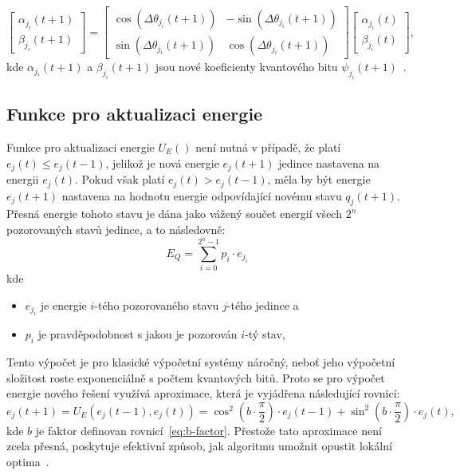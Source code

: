 \begin{equation*}
    \begin{bmatrix}
        \alpha_{j_i}\left(t+1\right) \\
        \beta_{j_i}\left(t+1\right)
    \end{bmatrix}
    =
    \begin{bmatrix}
        \cos{\left( \Delta\theta_{j_i}\left(t+1\right) \right)} & - \sin{\left( \Delta\theta_{j_i}\left(t+1\right) \right)} \\
        \sin{\left( \Delta\theta_{j_i}\left(t+1\right) \right)} &   \cos{\left( \Delta\theta_{j_i}\left(t+1\right) \right)}
    \end{bmatrix}
    \begin{bmatrix}
        \alpha_{j_i}\left(t\right) \\
        \beta_{j_i}\left(t\right) 
    \end{bmatrix},
\end{equation*}
kde $\alpha_{j_i}\left(t+1\right)$ a $\beta_{j_i}\left(t+1\right)$ jsou nové koeficienty kvantového bitu $\psi_{j_i}\left(t+1\right)$~\cite{qisa}.

\subsection{Funkce pro aktualizaci energie}\label{subsec:qisa-upd}
Funkce pro aktualizaci energie $U_E\left(\right)$ není nutná v případě, že platí $e_j\left(t\right) \leq e_j\left(t-1\right)$, jelikož je nová energie $e_j\left(t+1\right)$ jedince nastavena na energii $e_j\left(t\right)$. 
Pokud však platí $e_j\left(t\right) > e_j\left(t-1\right)$, měla by být energie $e_j\left(t+1\right)$ nastavena na hodnotu energie odpovídající novému stavu $q_j\left(t+1\right)$. 
Přesná energie tohoto stavu je dána jako vážený součet energií všech $2^n$ pozorovaných stavů jedince, a to následovně:
\begin{equation*}
    E_Q = \sum_{i=0}^{2^n-1} p_i \cdot e_{j_i}
\end{equation*}
kde 
\begin{itemize}
    \item $e_{j_i}$ je energie $i$-tého pozorovaného stavu $j$-tého jedince a
    \item $p_i$ je pravděpodobnost s jakou je pozorován $i$-tý stav,
\end{itemize}
Tento výpočet je pro klasické výpočetní systémy náročný, neboť jeho výpočetní složitost roste exponenciálně s počtem kvantových bitů. 
Proto se pro výpočet energie nového řešení využívá aproximace, která je vyjádřena následující rovnicí:
\begin{equation*}
    e_j\left(t+1\right) = U_E\left(e_j\left(t-1\right), e_j\left(t\right)\right) = \cos^2{\left(b \cdot \frac{\pi}{2}\right)} \cdot e_j\left(t-1\right) + \sin^2{\left(b \cdot \frac{\pi}{2}\right)} \cdot e_j\left(t\right),
\end{equation*}
kde $b$ je faktor definovan rovnicí~\ref{eq:b-factor}. 
Přestože tato aproximace není zcela přesná, poskytuje efektivní způsob, jak algoritmu umožnit opustit lokální optima~\cite{qisa}. 

